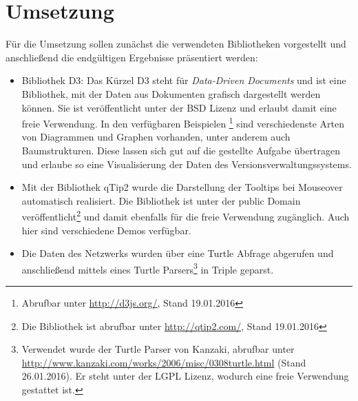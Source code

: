 \documentclass[nocolor]{tudbook}
\begin{document}
\section{Umsetzung}
Für die Umsetzung sollen zunächst die verwendeten Bibliotheken vorgestellt und anschließend die endgültigen Ergebnisse präsentiert werden:
\begin{itemize}
\item Bibliothek D3: Das Kürzel D3 steht für \textit{Data-Driven Documents} und ist eine Bibliothek, mit der Daten aus Dokumenten grafisch dargestellt werden können. Sie ist veröffentlicht unter der BSD Lizenz und erlaubt damit eine freie Verwendung. In den 	verfügbaren Beispielen \footnote{Abrufbar unter \url{http://d3js.org/}, Stand 19.01.2016} sind verschiedenste Arten von 			Diagrammen und Graphen vorhanden, unter anderem auch Baumstrukturen. Diese lassen sich gut auf die gestellte Aufgabe 			übertragen und erlaube so eine Visualisierung der Daten des Versionsverwaltungssystems.

\item Mit der Bibliothek qTip2 wurde die Darstellung der Tooltips bei Mouseover automatisch realisiert. Die Bibliothek ist unter der 			public Domain veröffentlicht\footnote{Die Bibliothek ist abrufbar unter \url{http://qtip2.com/}, Stand 19.01.2016} und damit 			ebenfalls für die freie Verwendung zugänglich. Auch hier sind verschiedene Demos verfügbar.

\item Die Daten des Netzwerks wurden über eine Turtle Abfrage abgerufen und anschließend mittels eines Turtle Parsers\footnote{Verwendet wurde der Turtle Parser von Kanzaki, abrufbar unter \url{http://www.kanzaki.com/works/2006/misc/0308turtle.html} (Stand 26.01.2016). Er steht unter der LGPL Lizenz, wodurch eine freie Verwendung gestattet ist.} in Triple geparst.
\end{itemize}
\end{document}
